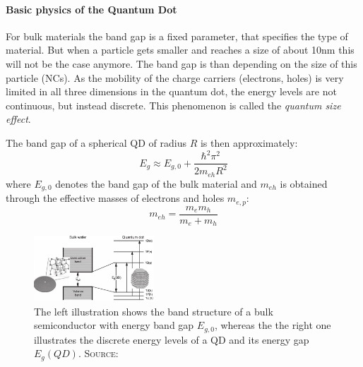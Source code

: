 	\paragraph{Basic physics of the Quantum Dot}
		For bulk materials the band gap  is a fixed parameter, that specifies the type of material. But when a particle gets smaller and reaches
		a size of about 10nm this will not be the case anymore. The band gap is than depending on the size of this particle (\glspl{NC}). As
		the mobility of the charge carriers (electrons, holes) is very limited in all three dimensions in the quantum dot, the energy levels
		are not continuous, but instead discrete.
		This phenomenon is called the {\it quantum size effect}.
		
		The band gap  of a spherical \gls{QD} of radius $R$ is then approximately:
		\begin{equation}
			E_{g} \approx E_{g,0} + \frac{\hbar^2 \pi^2}{2 m_{eh} R^2}
			\label{eq:Bandgap}
		\end{equation}
		where $E_{g,0}$ denotes the band gap of the bulk material and $m_{eh}$ is obtained through the effective masses of electrons and holes $m_{e,p}$:
		\begin{equation}
			m_{eh} = \frac{m_e m_h}{m_e + m_h}
			\label{eq:QuantumBox}
		\end{equation}
		
		\begin{figure}[htbp]
			\centering
			\includegraphics[width=0.4\textwidth]{Fig/QDTheory.pdf}
			\caption{The left illustration shows the band structure of a bulk semiconductor with energy band gap $E_{g,0}$,
							 whereas the the right one illustrates the discrete energy levels of a \gls{QD} and its energy gap $E_{g}(QD)$.
							 {\scshape Source:} \cite[p.3]{Klimov}}
			\label{fig:QDTheory}
		\end{figure}
		
